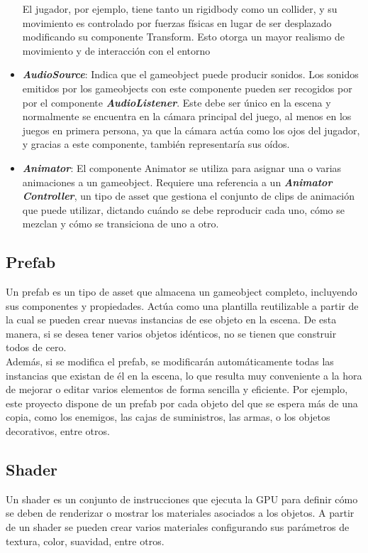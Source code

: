 \begin{itemize}
El jugador, por ejemplo, tiene tanto un rigidbody como un collider, y su movimiento es controlado por fuerzas físicas en lugar de ser desplazado modificando su componente Transform. Esto otorga un mayor realismo de movimiento y de interacción con el entorno

\item \textbf{\textit{AudioSource}}\cite{doc:AudioSource}: Indica que el gameobject puede producir sonidos. Los sonidos emitidos por los gameobjects con este componente pueden ser recogidos por por el componente \textbf{\textit{AudioListener}}. Este debe ser único en la escena y normalmente se encuentra en la cámara principal del juego, al menos en los juegos en primera persona, ya que la cámara actúa como los ojos del jugador, y gracias a este componente, también representaría sus oídos.
\item \textbf{\textit{Animator}}\cite{doc:Animator}: El componente Animator se utiliza para asignar una o varias animaciones a un gameobject. Requiere una referencia a un \textbf{\textit{Animator Controller}}, un  tipo de asset que gestiona el conjunto de clips de animación que puede utilizar, dictando cuándo se debe reproducir cada uno, cómo se mezclan y cómo se transiciona de uno a otro.	
\end{itemize}
\subsection{Prefab}
Un prefab \cite{doc:Prefabs} es un tipo de asset que almacena un gameobject completo, incluyendo sus componentes y propiedades. Actúa como una plantilla reutilizable a partir de la cual se pueden crear nuevas instancias de ese objeto en la escena. De esta manera, si se desea tener varios objetos idénticos, no se tienen que construir todos de cero.\\ Además, si se modifica el prefab, se modificarán automáticamente todas las instancias que existan de él en la escena, lo que resulta muy conveniente a la hora de mejorar o editar varios elementos de forma sencilla y eficiente.
Por ejemplo, este proyecto dispone de un prefab por cada objeto del que se espera más de una copia, como los enemigos, las cajas de suministros, las armas, o los objetos decorativos, entre otros.
\subsection{Shader}
Un shader \cite{doc:Shader} es un conjunto de instrucciones que ejecuta la GPU para definir cómo se deben de renderizar o mostrar los materiales asociados a los objetos.
A partir de un shader se pueden crear varios materiales configurando sus parámetros de textura, color, suavidad, entre otros.

